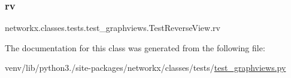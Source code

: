 \subsubsection{\texorpdfstring{rv}{rv}}
{\footnotesize\ttfamily networkx.\+classes.\+tests.\+test\+\_\+graphviews.\+Test\+Reverse\+View.\+rv}



The documentation for this class was generated from the following file\+:\begin{DoxyCompactItemize}
\item 
venv/lib/python3./site-\/packages/networkx/classes/tests/\hyperlink{test__graphviews_8py}{test\+\_\+graphviews.\+py}\end{DoxyCompactItemize}
